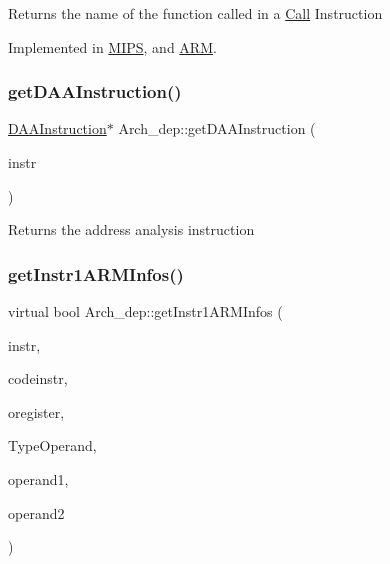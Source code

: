 Returns the name of the function called in a \hyperlink{classCall}{Call} Instruction 

Implemented in \hyperlink{classMIPS_adc2a687a1c64a5240d7d1ce7e294fdfc}{M\+I\+PS}, and \hyperlink{classARM_aefb97cfd945153e713c1303e467f9190}{A\+RM}.

\mbox{\label{classArch__dep_ab5a1e24af6e96eb1795aec07c1cd3578}} 
\subsubsection{\texorpdfstring{get\+D\+A\+A\+Instruction()}{getDAAInstruction()}}
{\footnotesize\ttfamily \hyperlink{classDAAInstruction}{D\+A\+A\+Instruction}$\ast$ Arch\+\_\+dep\+::get\+D\+A\+A\+Instruction (\begin{DoxyParamCaption}\item[{const string \&}]{instr }\end{DoxyParamCaption})}

Returns the address analysis instruction \mbox{\label{classArch__dep_a30cdbcdc129741df876bda79fd76e9fe}} 
\subsubsection{\texorpdfstring{get\+Instr1\+A\+R\+M\+Infos()}{getInstr1ARMInfos()}}
{\footnotesize\ttfamily virtual bool Arch\+\_\+dep\+::get\+Instr1\+A\+R\+M\+Infos (\begin{DoxyParamCaption}\item[{string \&}]{instr,  }\item[{string \&}]{codeinstr,  }\item[{string \&}]{oregister,  }\item[{\hyperlink{arch_8h_a63b66e201ffc27bbc8f89c8808382044}{offset\+Type} $\ast$}]{Type\+Operand,  }\item[{string \&}]{operand1,  }\item[{string \&}]{operand2 }\end{DoxyParamCaption})\hspace{0.3cm}{\ttfamily [pure virtual]}}



